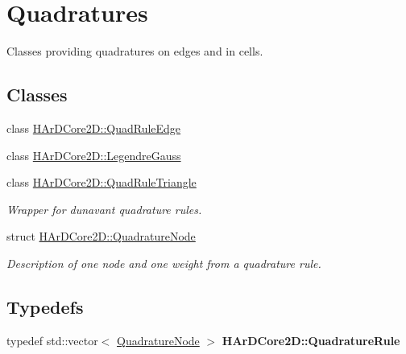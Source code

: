 \hypertarget{group__Quadratures}{}\section{Quadratures}
\label{group__Quadratures}


Classes providing quadratures on edges and in cells.  


\subsection*{Classes}
\begin{DoxyCompactItemize}
\item 
class \hyperlink{classHArDCore2D_1_1QuadRuleEdge}{H\+Ar\+D\+Core2\+D\+::\+Quad\+Rule\+Edge}
\item 
class \hyperlink{classHArDCore2D_1_1LegendreGauss}{H\+Ar\+D\+Core2\+D\+::\+Legendre\+Gauss}
\item 
class \hyperlink{classHArDCore2D_1_1QuadRuleTriangle}{H\+Ar\+D\+Core2\+D\+::\+Quad\+Rule\+Triangle}
\begin{DoxyCompactList}\small\item\em Wrapper for dunavant quadrature rules. \end{DoxyCompactList}\item 
struct \hyperlink{structHArDCore2D_1_1QuadratureNode}{H\+Ar\+D\+Core2\+D\+::\+Quadrature\+Node}
\begin{DoxyCompactList}\small\item\em Description of one node and one weight from a quadrature rule. \end{DoxyCompactList}\end{DoxyCompactItemize}
\subsection*{Typedefs}
\begin{DoxyCompactItemize}
\item 
\mbox{\label{group__Quadratures_ga08203d5fcf31125f46ed733ebfeac838}} 
typedef std\+::vector$<$ \hyperlink{structHArDCore2D_1_1QuadratureNode}{Quadrature\+Node} $>$ {\bfseries H\+Ar\+D\+Core2\+D\+::\+Quadrature\+Rule}
\end{DoxyCompactItemize}
